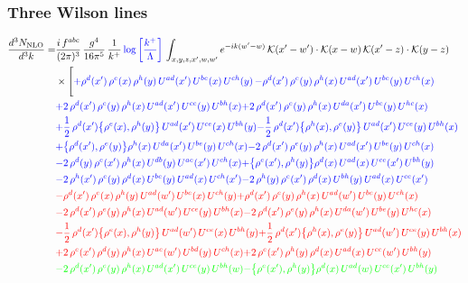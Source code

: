 \documentclass[9pt]{article}
\numberwithin{equation}{section}
\begin{document}
\subsubsection{Three Wilson lines}
\begin{align}
    \frac{d^{3}N_{\rm NLO}}{d^{3}k}= & \frac{i\,f^{abc}}{(2\pi)^{3}}\,\frac{g^{4}}{16\pi^{5}}\,\frac{1}{k^{+}}\,{\color{blue}\log{\left[\frac{k^{+}}{\Lambda}\right]}}\,\int_{x,y,z,x',w,w'}e^{-ik(w'-w)}\,\mathcal{K}(x'-w')\cdot\mathcal{K}(x-w)\,\mathcal{K}(x'-z)\cdot\mathcal{K}(y-z)\notag \\ & \times\Bigg[{\color{blue}+\rho^{d}(x')\,\rho^{e}(x)\,\rho^{h}(y)\,U^{ad}(x')\,U^{be}(x)\,U^{ch}(y)}\,{\color{blue}-\rho^{d}(x')\,\rho^{e}(y)\,\rho^{h}(x)\,U^{ad}(x')\,U^{be}(y)\,U^{ch}(x)}\notag \\ &{\color{blue}+2\,\rho^{d}(x')\,\rho^{e}(y)\,\rho^{h}(x)\,U^{ad}(x')\,U^{ce}(y)\,U^{bh}(x)}{\color{blue}+2\,\rho^{d}(x')\,\rho^{e}(y)\,\rho^{h}(x)\, U^{da}(x')\,U^{be}(y)\,U^{hc}(x)}\notag \\ & {\color{blue}+\frac{1}{2}\,\rho^{d}(x')\big\{\rho^{e}(x),\rho^{h}(y)\big\}\,U^{ad}(x')\,U^{ce}(x)\,U^{bh}(y)}{\color{blue}-\frac{1}{2}\,\rho^{d}(x')\big\{\rho^{h}(x),\rho^{e}(y)\big\}\,U^{ad}(x')\,U^{ce}(y)\,U^{bh}(x)}\notag \\ & {\color{blue}+\big\{\rho^{d}(x'),\rho^{e}(y)\big\}\rho^{h}(x)\,U^{da}(x')\,U^{be}(y)\,U^{ch}(x)}{\color{blue}-2\,\rho^{d}(x')\,\rho^{e}(y)\, \rho^{h}(x)\, U^{ad}(x')\,U^{be}(y)\,U^{ch}(x)}\notag \\ &{\color{blue}-2\,\rho^{d}(y)\,\rho^{e}(x')\, \rho^{h}(x)\, U^{db}(y)\,U^{ae}(x')\,U^{ch}(x)}{\color{blue}+\big\{\rho^{e}(x'),\rho^{h}(y)\big\}\rho^{d}(x)\,U^{ad}(x)\,U^{ce}(x')\,U^{bh}(y)}\notag \\ & {\color{blue}-2\,\rho^{h}(x')\,\rho^{e}(y)\,\rho^{d}(x)\,U^{be}(y)\,U^{ad}(x)\,U^{ch}(x')}{\color{blue}-2\,\rho^{h}(y)\,\rho^{e}(x')\,\rho^{d}(x)\,U^{bh}(y)\,U^{ad}(x)\,U^{ce}(x')}\notag \\ & {\color{red}-\rho^{d}(x')\,\rho^{e}(x)\,\rho^{h}(y)\,U^{ad}(w')\,U^{be}(x)\,U^{ch}(y)}{\color{red}+\rho^{d}(x')\,\rho^{e}(y)\,\rho^{h}(x)\,U^{ad}(w')\,U^{be}(y)\,U^{ch}(x)}\notag \\ &{\color{red}-2\,\rho^{d}(x')\,\rho^{e}(y)\,\rho^{h}(x)\,U^{ad}(w')\,U^{ce}(y)\,U^{bh}(x)} {\color{red}-2\,\rho^{d}(x')\,\rho^{e}(y)\,\rho^{h}(x)\, U^{da}(w')\,U^{be}(y)\,U^{hc}(x)}\notag \\ & {\color{red}-\frac{1}{2}\,\rho^{d}(x')\big\{\rho^{e}(x),\rho^{h}(y)\big\}\,U^{ad}(w')\,U^{ce}(x)\,U^{bh}(y)}{\color{red}+\frac{1}{2}\,\rho^{d}(x')\big\{\rho^{h}(x),\rho^{e}(y)\big\}\,U^{ad}(w')\,U^{ce}(y)\,U^{bh}(x)}\notag \\ & {\color{red}+2\,\rho^{e}(x')\,\rho^{d}(y)\, \rho^{h}(x)\, U^{ae}(w')\,U^{bd}(y)\,U^{ch}(x)}{\color{red}+2\,\rho^{e}(x')\,\rho^{h}(y)\,\rho^{d}(x)\,U^{ad}(x)\,U^{ce}(w')\,U^{bh}(y)}\notag \\ & {\color{green}-2\,\rho^{d}(x')\,\rho^{e}(y)\,\rho^{h}(x)\,U^{ad}(x')\,U^{ce}(y)\,U^{bh}(w)}{\color{green}-\big\{\rho^{e}(x'),\rho^{h}(y)\big\}\rho^{d}(x)\,U^{ad}(w)\,U^{ce}(x')\,U^{bh}(y)}\notag \\ & 
\end{align}
\end{document}
